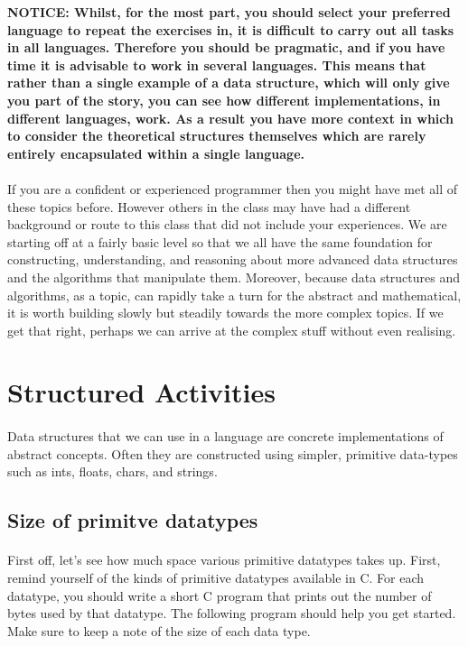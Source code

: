 \documentclass[10pt, a4paper, twosize]{article}
\begin{document}
\begin{framed}
{\bf{NOTICE:} Whilst, for the most part, you should select your preferred language to repeat the exercises in, it is difficult to carry out all tasks in all languages. Therefore you should be pragmatic, and if you have time it is advisable to work in several languages. This means that rather than a single example of a data structure, which will only give you part of the story, you can see how different implementations, in different languages, work. As a result you have more context in which to consider the theoretical structures themselves which are rarely entirely encapsulated within a single language.}  
\end{framed}

\paragraph{} If you are a confident or experienced programmer then you might have met all of these topics before. However others in the class may have had a different background or route to this class that did not include your experiences. We are starting off at a fairly basic level so that we all have the same foundation for constructing, understanding, and reasoning about more advanced data structures and the algorithms that manipulate them. Moreover, because data structures and algorithms, as a topic, can rapidly take a turn for the abstract and mathematical, it is worth building slowly but steadily towards the more complex topics. If we get that right, perhaps we can arrive at the complex stuff without even realising.

\section{Structured Activities}

\paragraph{} Data structures that we can use in a language are concrete implementations of abstract concepts. Often they are constructed using simpler, primitive data-types such as ints, floats, chars, and strings. 

\subsection{Size of primitve datatypes}
\paragraph{} First off, let's see how much space various primitive datatypes takes up. First, remind yourself of the kinds of primitive datatypes available in C. For each datatype, you should write a short C program that prints out the number of bytes used by that datatype. The following program should help you get started. Make sure to keep a note of the size of each data type.
\end{document}
